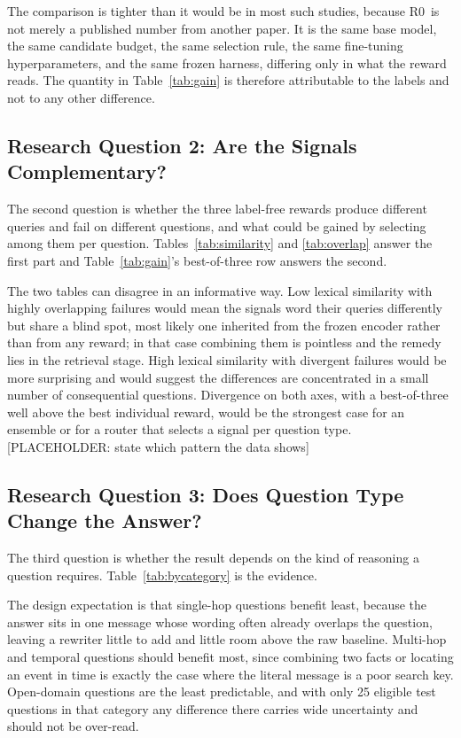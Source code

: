 \documentclass[12pt,letterpaper,oneside]{report}
\newcommand{\ph}[1]{\textcolor{phtext}{[\textsf{\footnotesize PLACEHOLDER: #1}]}}
\newcommand{\Rz}{R0}
\begin{document}
The comparison is tighter than it would be in most such studies, because \Rz\
is not merely a published number from another paper. It is the same base model,
the same candidate budget, the same selection rule, the same fine-tuning
hyperparameters, and the same frozen harness, differing only in what the reward
reads. The quantity in Table~\ref{tab:gain} is therefore attributable to the
labels and not to any other difference.

\subsection{Research Question 2: Are the Signals Complementary?}

The second question is whether the three label-free rewards produce different
queries and fail on different questions, and what could be gained by selecting
among them per question. Tables~\ref{tab:similarity} and \ref{tab:overlap}
answer the first part and Table~\ref{tab:gain}'s best-of-three row answers the
second.

The two tables can disagree in an informative way. Low lexical similarity with
highly overlapping failures would mean the signals word their queries
differently but share a blind spot, most likely one inherited from the frozen
encoder rather than from any reward; in that case combining them is pointless
and the remedy lies in the retrieval stage. High lexical similarity with
divergent failures would be more surprising and would suggest the differences
are concentrated in a small number of consequential questions. Divergence on
both axes, with a best-of-three well above the best individual reward, would be
the strongest case for an ensemble or for a router that selects a signal per
question type.
\ph{state which pattern the data shows}

\subsection{Research Question 3: Does Question Type Change the Answer?}

The third question is whether the result depends on the kind of reasoning a
question requires. Table~\ref{tab:bycategory} is the evidence.

The design expectation is that single-hop questions benefit least, because the
answer sits in one message whose wording often already overlaps the question,
leaving a rewriter little to add and little room above the raw baseline.
Multi-hop and temporal questions should benefit most, since combining two facts
or locating an event in time is exactly the case where the literal message is a
poor search key. Open-domain questions are the least predictable, and with only
25 eligible test questions in that category any difference there carries wide
uncertainty and should not be over-read.
\end{document}
